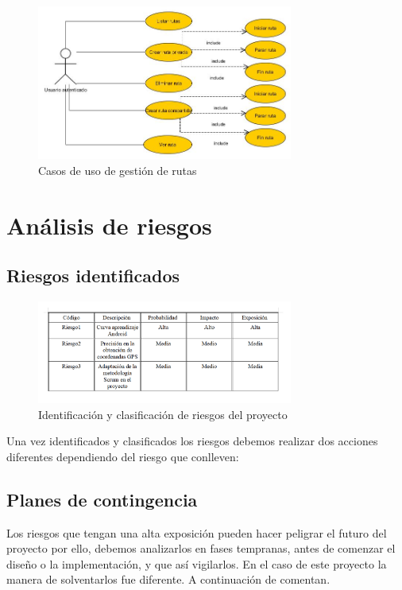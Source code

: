 \begin{figure}[H]
		\centering
		\includegraphics[width=0.75\textwidth] {rutas.jpg}
		\caption{Casos de uso de gestión de rutas }
		\label{fig:rutas}
	\end{figure}


\section{Análisis de riesgos}
\subsection{Riesgos identificados}
\begin{figure}[H]
		\centering
		\includegraphics[width=0.75\textwidth] {riesgos.png}
		\caption{Identificación y clasificación de riesgos del proyecto }\label{fig:riesgos}
	\end{figure}
	
	
Una vez identificados y clasificados los riesgos debemos realizar dos acciones diferentes dependiendo del riesgo que conlleven:
\subsection{Planes de contingencia} 

Los riesgos que tengan una alta exposición pueden hacer peligrar el futuro del proyecto por ello,  debemos analizarlos en fases tempranas, antes
de comenzar el diseño o la implementación, y que así   vigilarlos. En el caso de este proyecto la manera de solventarlos fue diferente.  A continuación de comentan.

